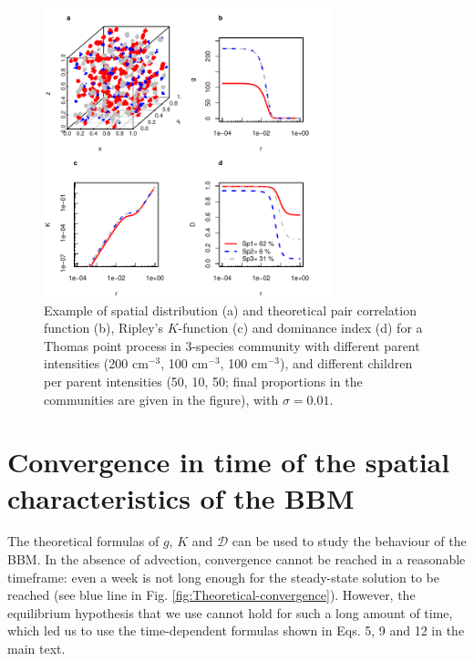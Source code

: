 \documentclass[english]{article}
\begin{document}
\begin{figure}[H]
\begin{centering}
\includegraphics[width=0.75\textwidth]{../code/figure/example_Thomas_distribution}
\par\end{centering}
\caption{Example of spatial distribution (a) and theoretical pair correlation
function (b), Ripley's $K$-function (c) and dominance index (d) for
a Thomas point process in 3-species community with different parent
intensities (200 cm$^{-3}$, 100 cm$^{-3}$, 100 cm$^{-3}$), and
different children per parent intensities (50, 10, 50; final proportions
in the communities are given in the figure), with $\sigma=0.01$.\label{fig:Example-Thomas}}
\end{figure}


\section{Convergence in time of the spatial characteristics of the BBM}

The theoretical formulas of $g$, $K$ and $\mathcal{D}$ can be used
to study the behaviour of the BBM. In the absence of advection, convergence
cannot be reached in a reasonable timeframe: even a week is not long
enough for the steady-state solution to be reached (see blue line
in Fig. \ref{fig:Theoretical-convergence}). However, the equilibrium
hypothesis that we use cannot hold for such a long amount of time,
which led us to use the time-dependent formulas shown in Eqs. 5, 9
and 12 in the main text.
\end{document}
